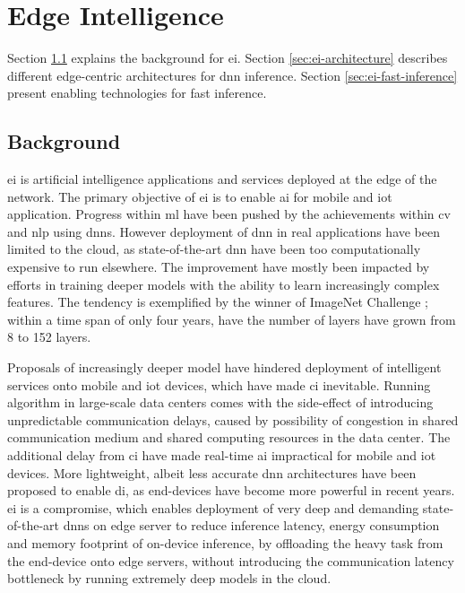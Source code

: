 \hypertarget{Edge Intelligence}{%
	\chapter{Edge Intelligence}\label{ch:edgeintelligence}}
\thispagestyle{fancy}


Section \ref{sec:ei-background} explains the background for \acrlong{ei}. Section \ref{sec:ei-architecture} describes different edge-centric architectures for \gls{dnn} inference. Section \ref{sec:ei-fast-inference} present enabling technologies for fast inference.


\section{Background}\label{sec:ei-background}

\acrlong{ei} is artificial intelligence applications and services deployed at the edge of the network. The primary objective of \gls{ei} is to enable \gls{ai} for mobile and \gls{iot} application. Progress within \gls{ml} have been pushed by the achievements within \gls{cv} and \gls{nlp} using \gls{dnn}s. However deployment of \gls{dnn} in real applications have been limited to the cloud, as state-of-the-art \gls{dnn} have been too computationally expensive to run elsewhere. The improvement have mostly been impacted by efforts in training deeper models with the ability to learn increasingly complex features. The tendency is exemplified by the winner of ImageNet Challenge \cite{russakovsky_imagenet_2015}; within a time span of only four years, have the number of layers have grown from 8 to 152 layers. 

Proposals of increasingly deeper model have hindered deployment of intelligent services onto mobile and \gls{iot} devices, which have made \gls{ci} inevitable. Running algorithm in large-scale data centers comes with the side-effect of introducing unpredictable communication delays, caused by possibility of congestion in shared communication medium and shared computing resources in the data center. The additional delay from \gls{ci} have made real-time \gls{ai} impractical for mobile and \gls{iot} devices. 
More lightweight, albeit less accurate \gls{dnn} architectures have been proposed to enable \gls{di}, as end-devices have become more powerful in recent years. \gls{ei} is a compromise, which enables deployment of very deep and demanding state-of-the-art \gls{dnn}s on edge server to reduce inference latency, energy consumption and memory footprint of on-device inference, by offloading the heavy task from the end-device onto edge servers, without introducing the communication latency bottleneck by running extremely deep models in the cloud. 

